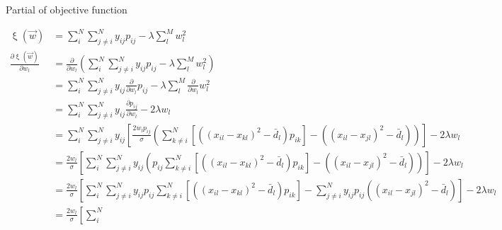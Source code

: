 \documentclass[12pt, a4paper]{article}
\begin{document}
\begin{section}{Partial of objective function}

    \begin{align*}
        \upxi(\vec w) &= \sum \limits_i^N \sum \limits_{j \neq i}^N y_{ij} p_{ij}
        - \lambda \sum \limits_l^M w_l^2 \\
        \frac{\partial \upxi(\vec w)}{\partial w_l} &=
            \frac{\partial}{\partial w_l} \left ( 
                \sum \limits_i^N \sum \limits_{j \neq i}^N y_{ij} p_{ij}
                - \lambda \sum \limits_l^M w_l^2 \right ) \\
        &=
            \sum \limits_i^N \sum \limits_{j \neq i}^N y_{ij}
                \frac{\partial}{\partial w_l}  p_{ij}
            - \lambda \sum \limits_l^M \frac{\partial}{\partial w_l} w_l^2 \\
        &=
            \sum \limits_i^N \sum \limits_{j \neq i}^N y_{ij}
            \frac{\partial p_{ij}}{\partial w_l} - 2 \lambda w_l \\
        &= 
            \sum \limits_i^N \sum \limits_{j \neq i}^N y_{ij}
            \left [
            \frac{2 w_l p_{ij}}{\sigma}
            \left (
                \sum \limits_{k \neq i}^N
                \left [ \left ( (x_{il} - x_{kl})^2 - \bar d_l \right ) p_{ik}
                \right ] -
                \left ( (x_{il} - x_{jl})^2 - \bar d_l \right )
            \right ) 
            \right ] - 2 \lambda w_l \\
        &= 
            \frac{2 w_l}{\sigma}
            \left [
            \sum \limits_i^N \sum \limits_{j \neq i}^N y_{ij}
            \left (
                p_{ij}
                \sum \limits_{k \neq i}^N
                \left [ \left ( (x_{il} - x_{kl})^2 - \bar d_l \right ) p_{ik}
                \right ] -
                \left ( (x_{il} - x_{jl})^2 - \bar d_l \right )
            \right )
            \right ] - 2 \lambda w_l \\
        &= 
            \frac{2 w_l}{\sigma}
            \left [
            \sum \limits_i^N \sum \limits_{j \neq i}^N y_{ij}
                p_{ij}
                \sum \limits_{k \neq i}^N
                \left [ \left ( (x_{il} - x_{kl})^2 - \bar d_l \right ) p_{ik}
                \right ] -
            \sum \limits_{j \neq i}^N y_{ij} p_{ij} 
                \left ( (x_{il} - x_{jl})^2 - \bar d_l \right )
            \right ] - 2 \lambda w_l \\
        &= 
            \frac{2 w_l}{\sigma}
            \left [
            \sum \limits_i^N 

\end{align*}
\end{section}
\end{document}
